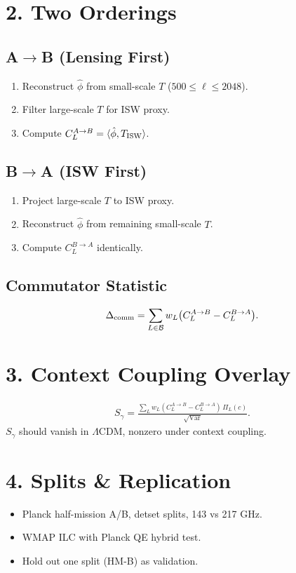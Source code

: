 \documentclass[11pt]{article}
\begin{document}
\section*{2. Two Orderings}
\subsection*{A$\to$B (Lensing First)}
\begin{enumerate}
\item Reconstruct $\hat{\phi}$ from small-scale $T$ ($500 \leq \ell \leq 2048$).
\item Filter large-scale $T$ for ISW proxy.
\item Compute $C^{A \to B}_L = \langle \hat{\phi}, T_{\rm ISW}\rangle$.
\end{enumerate}

\subsection*{B$\to$A (ISW First)}
\begin{enumerate}
\item Project large-scale $T$ to ISW proxy.
\item Reconstruct $\hat{\phi}$ from remaining small-scale $T$.
\item Compute $C^{B \to A}_L$ identically.
\end{enumerate}

\subsection*{Commutator Statistic}
\begin{align}
\Delta_{\rm comm} = \sum_{L \in \mathcal{B}} w_L \big(C^{A \to B}_L - C^{B \to A}_L\big).
\end{align}

\section*{3. Context Coupling Overlay}
\begin{align}
S_\gamma = \frac{\sum_{L} w_L (C^{A \to B}_L - C^{B \to A}_L)\,\Pi_L(c)}{\sqrt{\mathrm{Var}}}.
\end{align}
$S_\gamma$ should vanish in $\Lambda$CDM, nonzero under context coupling.

\section*{4. Splits \& Replication}
\begin{itemize}
\item Planck half-mission A/B, detset splits, 143 vs 217 GHz.
\item WMAP ILC with Planck QE hybrid test.
\item Hold out one split (HM-B) as validation.
\end{itemize}
\end{document}
